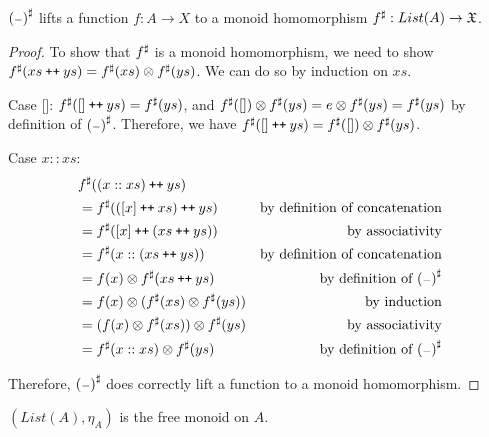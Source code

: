 \begin{proposition}
    ${({\scriptstyle{-}})}^{\sharp}$ lifts a function $f : A \to X$ to a monoid homomorphism ${f}^{\sharp} : List(A) \to \mathfrak{X}$.
\end{proposition}

\begin{proof}
    To show that ${f}^{\sharp}$ is a monoid homomorphism,
    we need to show ${f}^{\sharp}(xs \mathbin{\text{\ttfamily\upshape ++}} ys) = {f}^{\sharp}(xs) \otimes {f}^{\sharp}(ys)$.
    We can do so by induction on $xs$.

    Case []:
    ${f}^{\sharp}([] \mathbin{\text{\ttfamily\upshape ++}} ys) = {f}^{\sharp}(ys)$,
    and ${f}^{\sharp}([]) \otimes {f}^{\sharp}(ys) = e \otimes {f}^{\sharp}(ys) = {f}^{\sharp}(ys)$
    by definition of ${({\scriptstyle{-}})}^{\sharp}$. Therefore, we have
    ${f}^{\sharp}([] \mathbin{\text{\ttfamily\upshape ++}} ys) = {f}^{\sharp}([]) \otimes {f}^{\sharp}(ys)$.

    Case $x :: xs$:
    \begin{align*}
        & {f}^{\sharp}((x :: xs) \mathbin{\text{\ttfamily\upshape ++}} ys) \\
        & = {f}^{\sharp}(([ x ] \mathbin{\text{\ttfamily\upshape ++}} xs) \mathbin{\text{\ttfamily\upshape ++}} ys) & \text{by definition of concatenation} \\
        & = {f}^{\sharp}([ x ] \mathbin{\text{\ttfamily\upshape ++}} (xs \mathbin{\text{\ttfamily\upshape ++}} ys)) & \text{by associativity} \\
        & = {f}^{\sharp}(x :: (xs \mathbin{\text{\ttfamily\upshape ++}} ys)) & \text{by definition of concatenation} \\
        & = f(x) \otimes {f}^{\sharp}(xs \mathbin{\text{\ttfamily\upshape ++}} ys) & \text{by definition of ${({\scriptstyle{-}})}^{\sharp}$} \\
        & = f(x) \otimes ({f}^{\sharp}(xs) \otimes {f}^{\sharp}(ys)) & \text{by induction} \\
        & = (f(x) \otimes {f}^{\sharp}(xs)) \otimes {f}^{\sharp}(ys) & \text{by associativity} \\
        & = {f}^{\sharp}(x :: xs) \otimes {f}^{\sharp}(ys) & \text{by definition of ${({\scriptstyle{-}})}^{\sharp}$} \\
    \end{align*}

    Therefore, ${({\scriptstyle{-}})}^{\sharp}$ does correctly lift a function to a monoid homomorphism.
\end{proof}

\begin{proposition}
    $(List(A),\eta_A)$ is the free monoid on $A$.
\end{proposition}

